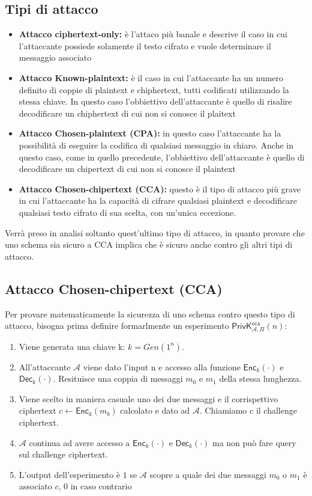 \subsection{Tipi di attacco}
\begin{itemize}
    \item{\textbf{Attacco ciphertext-only:} è l'attaco più banale e descrive il caso in cui l'attaccante possiede solamente il testo cifrato e vuole determinare il messaggio associato}
    \item{\textbf{Attacco Known-plaintext:} è il caso in cui l'attaccante ha un numero definito di coppie di plaintext e chiphertext, tutti codificati utilizzando la stessa chiave. In questo caso l'obbiettivo dell'attaccante è quello di risalire decodificare un chiphertext di cui non si conosce il plaitext}
    \item{\textbf{Attacco Chosen-plaintext (CPA):} in questo caso l'attaccante ha la possibilità di eseguire la codifica di qualsiasi messaggio in chiaro. Anche in questo caso, come in quello precedente, l'obbiettivo dell'attaccante è quello di decodificare un chipertext di cui non si conosce il plaintext}
    \item{\textbf{Attacco Chosen-chipertext (CCA):} questo è il tipo di attacco più grave in cui l'attaccante ha la capacità di cifrare qualsiasi plaintext e decodificare qualsiasi testo cifrato di sua scelta, con un'unica eccezione.}
\end{itemize}

Verrà preso in analisi soltanto quest'ultimo tipo di attacco, in quanto provare che uno schema sia sicuro a CCA implica che è sicuro anche contro gli altri tipi di attacco.

\subsection{Attacco Chosen-chipertext (CCA)}
Per provare matematicamente la sicurezza di uno schema contro questo tipo di attacco, bisogna prima definire formarlmente un esperimento $\mathsf{PrivK}^{\mathsf{cca}}_{\mathcal{A},\Pi}(n)$:

\begin{enumerate}
    \item{Viene generata una chiave k: $k = Gen(1^{n})$.}
    \item{All'attaccante $\mathcal{A}$ viene dato l'input n e accesso alla funzione $\mathsf{Enc}_{k}(\cdot)$ e $\mathsf{Dec}_{k}(\cdot)$. Resituisce una coppia di messaggi $m_{0}$ e $m_{1}$ della stessa lunghezza.}
    \item{Viene scelto in maniera casuale uno dei due messaggi e il corrispettivo ciphertext $c \gets \mathsf{Enc}_{k}(m_{b})$ calcolato e dato ad $\mathcal{A}$. Chiamiamo c il challenge ciphertext.}
    \item{$\mathcal{A}$ continua ad avere accesso a $\mathsf{Enc}_{k}(\cdot)$ e $\mathsf{Dec}_{k}(\cdot)$ ma non può fare query sul challenge ciphertext.}
    \item{L'output dell'esperimento è $1$ se $\mathcal{A}$ scopre a quale dei due messaggi $m_{0}$ o $m_{1}$ è associato $c$, $0$ in caso contrario}
\end{enumerate}

